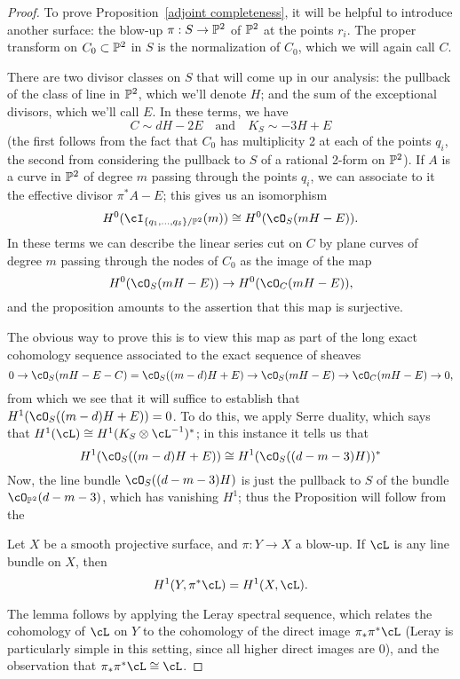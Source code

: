\begin{proof}
To prove Proposition~\ref{adjoint completeness}, it will be helpful to introduce another surface: the blow-up $\pi : S \to \PP^2$ of $\PP^2$ at the points $r_i$. The proper transform on $C_0 \subset \PP^2$ in $S$ is the normalization of $C_0$, which we will again call $C$.

There are two divisor classes on $S$ that will come up in our analysis: the pullback of the class of line in $\PP^2$, which we'll denote $H$; and the sum of the exceptional divisors, which we'll call $E$. In these terms, we have
$$
C \sim dH - 2E \quad \text{and} \quad K_S \sim -3H + E
$$
(the first follows from the fact that $C_0$ has multiplicity 2 at each of the points $q_i$, the second from considering the pullback to $S$ of a rational 2-form on $\PP^2$). If $A$ is a curve in $\PP^2$ of degree $m$ passing through the points $q_i$, we can associate to it the effective divisor $\pi^*A - E$; this gives us an isomorphism
$$
H^0(\cI_{\{q_1,\dots,q_\delta\}/\PP^2}(m)) \cong H^0(\cO_S(mH-E)).
$$
In these terms we can describe the linear series cut on $C$ by plane curves of degree $m$ passing through the nodes of $C_0$ as the image of the map
$$
H^0(\cO_S(mH-E)) \to H^0(\cO_C(mH-E)),
$$
and the proposition amounts to the assertion that this map is surjective.

The obvious way to prove this is to view this map as part of the long exact cohomology sequence associated to the exact sequence of sheaves
$$
0 \to \cO_S(mH-E-C) = \cO_S((m-d)H + E)  \to \cO_S(mH-E) \to \cO_C(mH-E) \to 0,
$$
from which we see that it will suffice to establish that $H^1(\cO_S((m-d)H + E)) = 0$. To do this, we apply Serre duality, which says that $H^1(\cL) \cong H^1(K_S\otimes \cL^{-1})^*$; in this instance it 
tells us that
$$
H^1(\cO_S((m-d)H + E)) \cong H^1(\cO_S((d-m-3)H))^*
$$
Now, the line bundle $\cO_S((d-m-3)H)$ is just the pullback to $S$ of the bundle $\cO_{\PP^2}(d-m-3)$, which has vanishing $H^1$; thus the Proposition will follow from the 
\begin{lemma}
Let $X$ be a smooth projective surface, and $\pi : Y \to X$ a blow-up. If $\cL$ is any line bundle on $X$, then
$$
H^1(Y, \pi^*\cL) = H^1(X, \cL).
$$
\end{lemma}
The lemma follows by applying the Leray spectral sequence, which relates the cohomology of $\cL$ on $Y$ to the cohomology of the direct image $\pi_*\pi^*\cL$ (Leray is particularly simple in this setting, since all higher direct images are 0), and the observation that $\pi_*\pi^*\cL \cong \cL$.
\end{proof}


